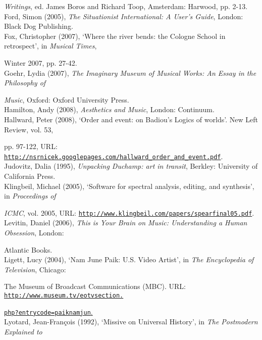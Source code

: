 \emph{Writings}, ed. James Boros and Richard Toop, Amsterdam: Harwood, pp. 2-13.
\hypertarget{ford}{}\\
Ford, Simon (2005), \emph{The Situationist International: A User's Guide}, London: Black Dog Publishing.
\hypertarget{fox}{}\\
Fox, Christopher (2007), `Where the river bends: the Cologne School in retrospect', in  \emph{Musical Times}, 

Winter 2007, pp. 27-42.
\hypertarget{goer}{}\\
Goehr, Lydia (2007), \emph{The Imaginary Museum of Musical Works: An Essay in the Philosophy of}

\emph{Music}, Oxford: Oxford University Press.
\hypertarget{hamilton}{}\\
Hamilton, Andy (2008), \emph{Aesthetics and Music}, London: Continuum. 
 \hypertarget{hallward}{}\\
Hallward, Peter (2008), `Order and event: on Badiou's Logics of worlds'. New Left Review, vol. 53, 

pp. 97-122, URL: \href{http://nsrnicek.googlepages.com/hallward_order_and_event.pdf}{\texttt{http://nsrnicek.googlepages.com/hallward\_order\_and\_event.pdf}}.
\hypertarget{judovitz}{}\\
Judovitz, Dalia (1995), \emph{Unpacking Duchamp: art in transit}, Berkley: University of California Press. 
\hypertarget{klingbeil}{}\\
Klingbeil, Michael (2005), `Software for spectral analysis, editing, and synthesis', in \emph{Proceedings of}

\emph{ICMC}, vol. 2005, URL: \href{http://www.klingbeil.com/papers/spearfinal05.pdf}{\texttt{http://www.klingbeil.com/papers/spearfinal05.pdf}}.
\hypertarget{musmind}{} \\ 
Levitin, Daniel (2006), \emph{This is Your Brain on Music: Understanding a Human Obsession}, London: 

Atlantic Books. 
\hypertarget{ligett}{} \\ 
Ligett, Lucy (2004), `Nam June Paik: U.S. Video Artist', in \emph{The Encyclopedia of Television}, Chicago: 

The Museum of Broadcast Communications (MBC). URL: \href{http://www.museum.tv/eotvsection.php?entrycode=paiknamjun}{\texttt{http://www.museum.tv/eotvsection.}}

\href{http://www.museum.tv/eotvsection.php?entrycode=paiknamjun}{\texttt{php?entrycode=paiknamjun}.}
\hypertarget{lyotard}{}\\
Lyotard, Jean-Fran\c{c}ois (1992), `Missive on Universal History', in \emph{The Postmodern Explained to}

